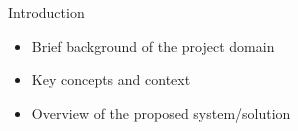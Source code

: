 
\begin{frame}{Introduction}
    \begin{itemize}
        \item Brief background of the project domain
        \item Key concepts and context
        \item Overview of the proposed system/solution
    \end{itemize}
\end{frame}
